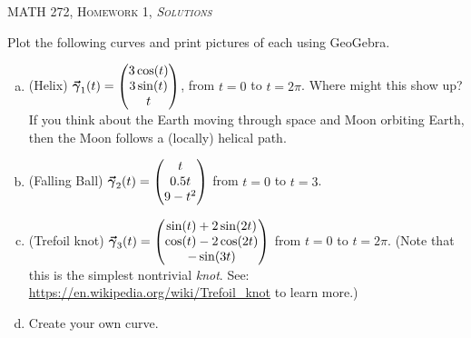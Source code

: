 \documentclass[12pt]{article} %
\begin{document}
\begin{center}
   \textsc{\large MATH 272, Homework 1, \emph{Solutions}}\\
\end{center}
\vspace{.5cm}

\begin{problem}
Plot the following curves and print pictures of each using GeoGebra.  
\begin{enumerate}[(a)]
	\item (Helix) $\boldsymbol{\vec{\gamma}}_1(t) = \begin{pmatrix} 3\cos(t) \\ 3\sin(t) \\ t\end{pmatrix}$, from $t=0$ to $t=2\pi$. Where might this show up? If you think about the Earth moving through space and Moon orbiting Earth, then the Moon follows a (locally) helical path.
	
	\item (Falling Ball) $\boldsymbol{\vec{\gamma}}_2(t) = \begin{pmatrix} t\\  0.5t \\ 9-t^2 \end{pmatrix}$ from $t=0$ to $t=3$.
	
	\item (Trefoil knot) $\boldsymbol{\vec{\gamma}}_3(t) = \begin{pmatrix} \sin(t)+2\sin(2t) \\ \cos(t)-2\cos(2t) \\ -\sin(3t) \end{pmatrix}$ from $t=0$ to $t=2\pi$. (Note that this is the simplest nontrivial \emph{knot}. See: \url{https://en.wikipedia.org/wiki/Trefoil_knot} to learn more.)
	
	\item Create your own curve.
\end{enumerate}
\end{problem}
\end{document}
